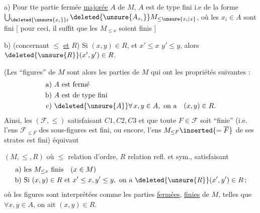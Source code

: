 a)  Pour tte partie fermée \uline{majorée} $A$\deleted{\unsure{,}} de $M$, $A$ est de type fini i.e de la forme $\bigcup_{\deleted{\unsure{x_i}}i}\deleted{\unsure{A_{x_i}}}M_{\leq\unsure{x_i|x}}$, où les $x_i\in A$  sont   fini [ pour ceci, il suffit que les $M_{\leq x}$ soient finis ]


b) (concernant $\leq$ \uline{et} $R$) Si $(x,y)\in R$, et $x'\leq x$ $y'\leq y$, alors $\deleted{\unsure{R}}(x',y')\in R$.


(Les ``figures'' de $M$ sont alors les parties  de $M$ qui ont les propriétés suivantes :
\[
\begin{aligned}
\text{a) } & A\text{ est fermé}\\
\text{b) } & A\text{ est de type fini}\\
\text{c) } & \deleted{\unsure{A}}\forall\,x,y\in A,\ \text{on a}\quad (x,y)\in R.
\end{aligned}
\]
 Ainsi, les  $(\mathcal F,\leq)$ satisfaisant $C1,C2,C3$ et  que toute $F\in\mathcal F$ soit ``finie'' (i.e. l'ens $\mathcal F_{\leq F}$ des sous-figures est fini, ou encore, l'ens $M_{\leq F}\inserted{=\overline F}$  de  ses strates est fini) équivaut 

$(M,\leq,R)$  où $\leq$ relation d'ordre, $R$ relation refl. et sym., satisfaisant
\[
\begin{aligned}
\text{a) }&\text{les }M_{\leq x}\text{ finis}\quad(x\in M)\\
\text{b) }&\text{Si }(x,y)\in R\text{ et }x'\leq x,y'\leq y,\ \text{on a }\deleted{\unsure{R}}(x',y')\in R\,;
\end{aligned}
\]
où les figures sont interprétées comme les parties \uline{fermées}, \uline{finies}  de $M$, telles que $\forall x,y\in A$, on ait $(x,y)\in R$.


